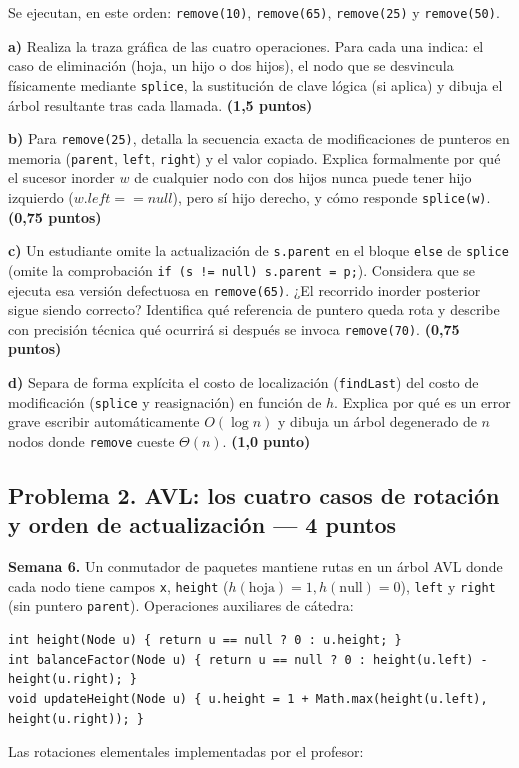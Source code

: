 \documentclass[10pt,a4paper]{article}
\newcommand{\pts}[1]{\textbf{(#1)}}
\begin{document}
Se ejecutan, en este orden: \texttt{remove(10)}, \texttt{remove(65)}, \texttt{remove(25)} y \texttt{remove(50)}.

\textbf{a)} Realiza la traza gráfica de las cuatro operaciones. Para cada una indica: el caso de eliminación (hoja, un hijo o dos hijos), el nodo que se desvincula físicamente mediante \texttt{splice}, la sustitución de clave lógica (si aplica) y dibuja el árbol resultante tras cada llamada. \pts{1,5 puntos}

\textbf{b)} Para \texttt{remove(25)}, detalla la secuencia exacta de modificaciones de punteros en memoria (\texttt{parent}, \texttt{left}, \texttt{right}) y el valor copiado. Explica formalmente por qué el sucesor inorder $w$ de cualquier nodo con dos hijos nunca puede tener hijo izquierdo ($w.left == null$), pero sí hijo derecho, y cómo responde \texttt{splice(w)}. \pts{0,75 puntos}

\textbf{c)} Un estudiante omite la actualización de \texttt{s.parent} en el bloque \texttt{else} de \texttt{splice} (omite la comprobación \texttt{if (s != null) s.parent = p;}). Considera que se ejecuta esa versión defectuosa en \texttt{remove(65)}. ¿El recorrido inorder posterior sigue siendo correcto? Identifica qué referencia de puntero queda rota y describe con precisión técnica qué ocurrirá si después se invoca \texttt{remove(70)}. \pts{0,75 puntos}

\textbf{d)} Separa de forma explícita el costo de localización (\texttt{findLast}) del costo de modificación (\texttt{splice} y reasignación) en función de $h$. Explica por qué es un error grave escribir automáticamente $O(\log n)$ y dibuja un árbol degenerado de $n$ nodos donde \texttt{remove} cueste $\Theta(n)$. \pts{1,0 punto}

\newpage
\subsection*{Problema 2. AVL: los cuatro casos de rotación y orden de actualización --- 4 puntos}

\footnotesize
\textbf{Semana 6.} Un conmutador de paquetes mantiene rutas en un árbol AVL donde cada nodo tiene campos \texttt{x}, \texttt{height} ($h(\text{hoja})=1, h(\text{null})=0$), \texttt{left} y \texttt{right} (sin puntero \texttt{parent}). Operaciones auxiliares de cátedra:
\begin{lstlisting}
int height(Node u) { return u == null ? 0 : u.height; }
int balanceFactor(Node u) { return u == null ? 0 : height(u.left) - height(u.right); }
void updateHeight(Node u) { u.height = 1 + Math.max(height(u.left), height(u.right)); }
\end{lstlisting}
\vspace{-2pt}
Las rotaciones elementales implementadas por el profesor:
\end{document}
